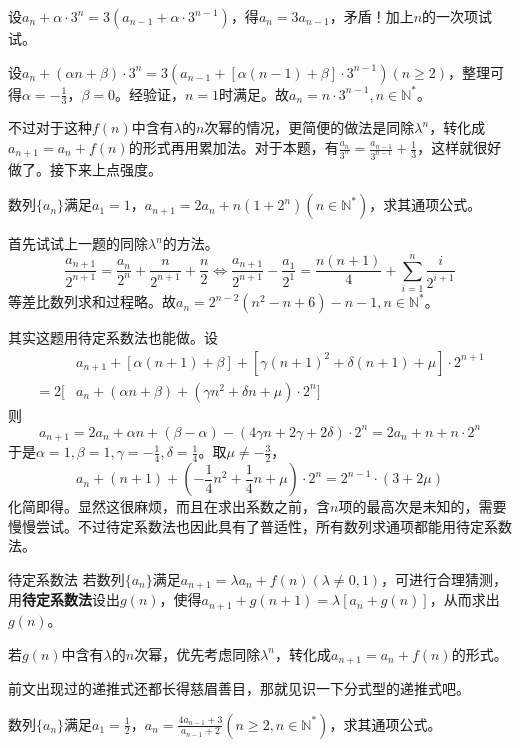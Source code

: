 \documentclass[../sample]{subfiles}
\begin{document}
设$a_n+\alpha·3^n=3(a_{n-1}+\alpha·3^{n-1})$，得$a_n=3a_{n-1}$，矛盾！加上$n$的一次项试试。

设$a_n+(\alpha n+\beta)·3^n=3(a_{n-1}+[\alpha(n-1)+\beta]·3^{n-1})(n\geq 2)$，整理可得$\alpha=-\frac{1}{3}$，$\beta=0$。经验证，$n=1$时满足。故$a_n=n·3^{n-1}, n\in\mathbb{N^*}$。

不过对于这种$f(n)$中含有$\lambda$的$n$次幂的情况，更简便的做法是同除$\lambda^n$，转化成$a_{n+1}=a_{n}+f(n)$的形式再用累加法。对于本题，有$\frac{a_n}{3^n}=\frac{a_{n-1}}{3^{n-1}}+\frac{1}{3}$，这样就很好做了。接下来上点强度。

\begin{problem}
  数列$\{a_n\}$满足$a_1=1$，$a_{n+1}=2a_{n}+n(1+2^n)(n\in\mathbb{N^*})$，求其通项公式。
\end{problem}

首先试试上一题的同除$\lambda^n$的方法。
\[\frac{a_{n+1}}{2^{n+1}}=\frac{a_n}{2^n}+\frac{n}{2^{n+1}}+\frac{n}{2}\Leftrightarrow \frac{a_{n+1}}{2^{n+1}}-\frac{a_1}{2^1}=\frac{n(n+1)}{4}+\sum_{i=1}^{n}\frac{i}{2^{i+1}}\]
等差比数列求和过程略。故$a_n=2^{n-2}(n^2-n+6)-n-1, n\in\mathbb{N^*}$。

其实这题用待定系数法也能做。设\[\begin{aligned}
  &a_{n+1}+[\alpha (n+1)+\beta]+[\gamma(n+1)^2+\delta(n+1)+\mu]·2^{n+1}\\
  =2[&a_n+(\alpha n+\beta)+(\gamma n^2+\delta n+\mu)·2^n]
\end{aligned}\]
则\[a_{n+1}=2a_n+\alpha n+(\beta-\alpha)-(4\gamma n+2\gamma +2\delta )·2^n=2a_n+n+n·2^n\]
于是$\alpha=1, \beta=1, \gamma=-\frac{1}{4}, \delta=\frac{1}{4}$。取$\mu\neq -\frac{3}{2}$，
\[a_n+(n+1)+(-\frac{1}{4}n^2+\frac{1}{4}n+\mu)·2^n=2^{n-1}·(3+2\mu)\]
化简即得。显然这很麻烦，而且在求出系数之前，含$n$项的最高次是未知的，需要慢慢尝试。不过待定系数法也因此具有了普适性，所有数列求通项都能用待定系数法。
\newpage
\begin{theorem}{待定系数法}
  若数列$\{a_n\}$满足$a_{n+1}=\lambda a_{n}+f(n)(\lambda\neq 0, 1)$，可进行合理猜测，用\textbf{待定系数法}设出$g(n)$，使得$a_{n+1}+g(n+1)=\lambda[a_n+g(n)]$，从而求出$g(n)$。

  若$g(n)$中含有$\lambda$的$n$次幂，优先考虑同除$\lambda^n$，转化成$a_{n+1}=a_{n}+f(n)$的形式。
\end{theorem}

前文出现过的递推式还都长得慈眉善目，那就见识一下分式型的递推式吧。

\begin{problem}
  数列$\{a_n\}$满足$a_1=\frac{1}{2}$，$a_n=\frac{4a_{n-1}+3}{a_{n-1}+2}(n\geq 2,n\in\mathbb{N^*})$，求其通项公式。
\end{problem}
\end{document}
